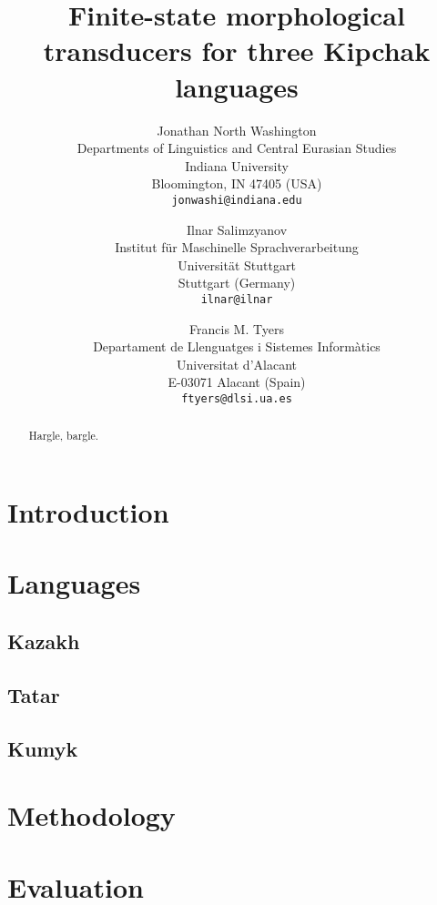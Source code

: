 \documentclass{article}
\title{Finite-state morphological transducers for three Kipchak languages}
\author{Jonathan North Washington \\
Departments of Linguistics and Central Eurasian Studies\\
Indiana University\\
Bloomington, IN 47405 (USA)\\
\texttt{jonwashi@indiana.edu} \and
Ilnar Salimzyanov  \\
Institut für Maschinelle Sprachverarbeitung \\
Universität Stuttgart\\
Stuttgart (Germany) \\
\texttt{ilnar@ilnar} \and 
Francis M. Tyers\\
Departament de Llenguatges i Sistemes Informàtics \\  
Universitat d'Alacant\\
E-03071 Alacant (Spain)\\
\texttt{ftyers@dlsi.ua.es} 
}
\begin{document}
\maketitle

\begin{abstract}
Hargle, bargle.
\end{abstract}

\section{Introduction}

\cite{washington2012}
\cite{salimzyanov2013}

\section{Languages}

\subsection{Kazakh}

\subsection{Tatar}

\subsection{Kumyk}

\cite{bammatov1960}

\section{Methodology}

\section{Evaluation}
\end{document}
